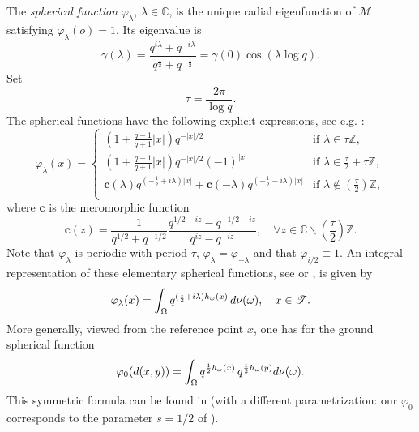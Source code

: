 \documentclass[10pt,a4paper]{amsart}
\renewcommand\mathcal{\mathscr}
\def\int{\intop\nolimits}
\theoremstyle{plain}
\theoremstyle{remark}
\theoremstyle{definition}
\begin{document}
    The \textit{spherical function} $\varphi_\lambda$, $\lambda\in\mathbb C$, is
the unique radial eigenfunction of $\mathcal M$ satisfying
$\varphi_\lambda(o)=1$. Its eigenvalue is
	\begin{equation}\label{gammalambda0}
		\gamma(\lambda)=\frac{q^{i\lambda}+q^{-i\lambda}}{q^{\frac{1}{2}}+q^{-\frac{1}{2}}}=\gamma(0)\cos(\lambda \log q).
	\end{equation}
    Set 
	$$\tau=\frac{2\pi}{\log q}.$$ 
	 The spherical functions have the following explicit expressions, see e.g. \cite[p.1273]{CMS}:
	\begin{equation} \label{eq:sphericalT}
		\varphi_\lambda(x)=
		\begin{cases}
			\left( 1+\frac{q-1}{q+1}|x| \right)q^{-|x|/2} & \text{if } \lambda \in \tau\mathbb{Z},\\
			\left( 1+\frac{q-1}{q+1}|x| \right)q^{-|x|/2}(-1)^{|x|} & \text{if } \lambda \in \frac{\tau}{2}+\tau\mathbb{Z},\\
			\textbf{c}(\lambda)q^{( -\frac{1}{2}+i\lambda)|x|}+\textbf{c}(-\lambda)q^{( -\frac{1}{2}-i\lambda)|x|} & \text{if } \lambda \notin (\frac{\tau}{2})\mathbb{Z}, \\
		\end{cases}
	\end{equation}
	where $\textbf{c}$ is the meromorphic function
	\begin{equation} \label{cfunc}
		\textbf{c}(z)=\frac{1}{q^{1/2}+q^{-1/2}} \frac{q^{1/2+iz}-q^{-1/2-iz}}{q^{iz}-q^{-iz}}, \quad \forall z \in \mathbb{C} \backslash (\frac{\tau}{2})\mathbb{Z}.
	\end{equation}
	Note that $\varphi_\lambda$ is periodic with period $\tau$, $\varphi_{\lambda}=\varphi_{-\lambda}$ and that $\varphi_{i/2}\equiv 1$. An integral representation of these elementary spherical functions, see \cite[p.400]{CMS0} or \cite[Theorem 2.1]{Figa}, is given by 
\begin{equation}\label{eq:integralrepspherical}
		\varphi_{\lambda}(x)=\int_{\Omega} {q^{(\frac{1}{2}+i\lambda)h_\omega(x)} }\,d\nu(\omega), \quad x\in \mathcal{T}.
	\end{equation}
	More generally, viewed from the reference point $x$, one has for the ground spherical function
\begin{equation}\label{eq:integralrepspherical0}
\varphi_0(d(x,y))=
		\int_\Omega q^{\frac{1}{2}h_{\omega}(x)}\,
		 q^{\frac{1}{2}h_{\omega}(y)}   d\nu( \omega).
\end{equation} 
This symmetric formula can be found in \cite[p.55]{Figa} (with a different parametrization: our $\varphi_0$ corresponds to the parameter $s=1/2$ of \cite{Figa}).
\end{document}
